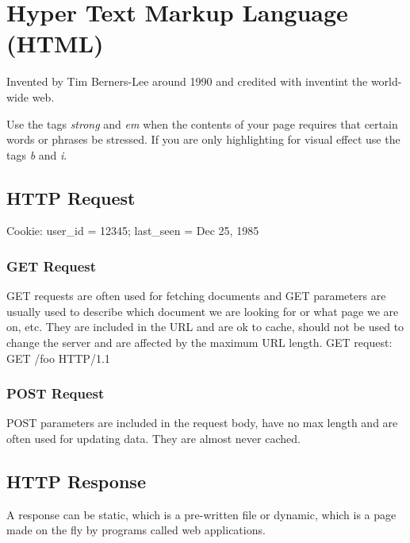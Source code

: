 \documentclass[12pt]{article}
\begin{document}
\section{Hyper Text Markup Language (HTML)}

Invented by Tim Berners-Lee around 1990 and credited with inventint the world-wide web.

Use the tags \emph{strong} and \emph{em} when the contents of your page requires that certain words or phrases be stressed. If you are only highlighting for visual effect use the tags \emph{b} and \emph{i}.

\subsection{HTTP Request}

\begin{list}{*}{
\setlength{\itemsep}{0pt}
\setlength{\parsep}{0pt}
\setlength{\topsep}{0pt}
\setlength{\partopsep}{0pt}
\setlength{\leftmargin}{2em}
\setlength{\labelwidth}{1.5em}
\setlength{\labelsep}{0.5em}
}
\item Cookie: user\_id = 12345; last\_seen = Dec 25, 1985
\end{list}

\subsubsection{GET Request}

GET requests are often used for fetching documents and GET parameters are usually used to describe which document we are looking for or what page we are on, etc. They are included in the URL and are ok to cache, should not be used to change the server and are affected by the maximum URL length.
GET request: GET /foo HTTP/1.1

\subsubsection{POST Request}

POST parameters are included in the request body, have no max length and are often used for updating data. They are almost never cached.

\subsection{HTTP Response}
A response can be static, which is a pre-written file or dynamic, which is a page made on the fly by programs called web applications.
\end{document}
